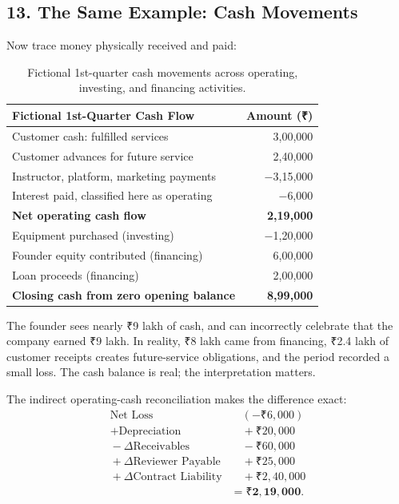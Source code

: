 \subsection*{13. The Same Example: Cash Movements}

Now trace money physically received and paid:

\begin{table}[htbp]
\centering
\small
\begin{tabularx}{\columnwidth}{Xr}
\toprule
\textbf{Fictional 1st-Quarter Cash Flow} & \textbf{Amount (₹)} \\
\midrule
Customer cash: fulfilled services & 3,00,000 \\
Customer advances for future service & 2,40,000 \\
Instructor, platform, marketing payments & $-$3,15,000 \\
Interest paid, classified here as operating & $-$6,000 \\
\midrule
\textbf{Net operating cash flow} & \textbf{2,19,000} \\
Equipment purchased (investing) & $-$1,20,000 \\
Founder equity contributed (financing) & 6,00,000 \\
Loan proceeds (financing) & 2,00,000 \\
\midrule
\textbf{Closing cash from zero opening balance} & \textbf{8,99,000} \\
\bottomrule
\end{tabularx}
\caption{Fictional 1st-quarter cash movements across operating, investing, and financing activities.}
\end{table}

The founder sees nearly ₹9 lakh of cash, and can incorrectly celebrate that the company earned ₹9 lakh. In reality, ₹8 lakh came from financing, ₹2.4 lakh of customer receipts creates future-service obligations, and the period recorded a small loss. The cash balance is real; the interpretation matters.

The indirect operating-cash reconciliation makes the difference exact:
\begin{equation}
\begin{aligned}
\text{Net Loss} &\quad (-₹6,000) \\
{}+ \text{Depreciation} &\quad {}+ ₹20,000 \\
{}- \Delta\text{Receivables} &\quad {}- ₹60,000 \\
{}+ \Delta\text{Reviewer Payable} &\quad {}+ ₹25,000 \\
{}+ \Delta\text{Contract Liability} &\quad {}+ ₹2,40,000 \\
&= \mathbf{₹2,19,000}.
\end{aligned}
\end{equation}

